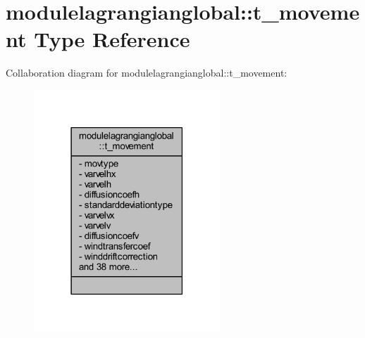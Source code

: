 \hypertarget{structmodulelagrangianglobal_1_1t__movement}{}\section{modulelagrangianglobal\+:\+:t\+\_\+movement Type Reference}
\label{structmodulelagrangianglobal_1_1t__movement}


Collaboration diagram for modulelagrangianglobal\+:\+:t\+\_\+movement\+:\nopagebreak
\begin{figure}[H]
\begin{center}
\leavevmode
\includegraphics[width=198pt]{structmodulelagrangianglobal_1_1t__movement__coll__graph}
\end{center}
\end{figure}
